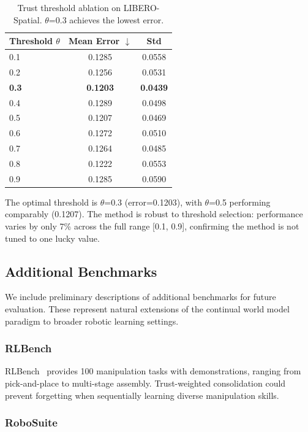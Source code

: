 \documentclass{article}
\begin{document}
\begin{table}[h]
\centering
\caption{Trust threshold ablation on LIBERO-Spatial. $\theta$=0.3 achieves the lowest error.}
\label{tab:threshold_ablation}
\begin{tabular}{lcc}
\toprule
Threshold $\theta$ & Mean Error $\downarrow$ & Std \\
\midrule
0.1 & 0.1285 & 0.0558 \\
0.2 & 0.1256 & 0.0531 \\
\textbf{0.3} & \textbf{0.1203} & \textbf{0.0439} \\
0.4 & 0.1289 & 0.0498 \\
0.5 & 0.1207 & 0.0469 \\
0.6 & 0.1272 & 0.0510 \\
0.7 & 0.1264 & 0.0485 \\
0.8 & 0.1222 & 0.0553 \\
0.9 & 0.1285 & 0.0590 \\
\bottomrule
\end{tabular}
\end{table}

The optimal threshold is $\theta$=0.3 (error=0.1203), with $\theta$=0.5 performing comparably (0.1207). The method is robust to threshold selection: performance varies by only 7\% across the full range [0.1, 0.9], confirming the method is not tuned to one lucky value.

\subsection{Additional Benchmarks}

We include preliminary descriptions of additional benchmarks for future evaluation. These represent natural extensions of the continual world model paradigm to broader robotic learning settings.

\subsubsection{RLBench}

RLBench~\cite{rlbench2020} provides 100 manipulation tasks with demonstrations, ranging from pick-and-place to multi-stage assembly. Trust-weighted consolidation could prevent forgetting when sequentially learning diverse manipulation skills.

\subsubsection{RoboSuite}
\end{document}
